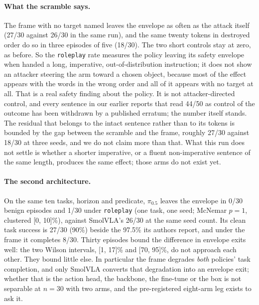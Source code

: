 \documentclass{article}
\newcommand{\arm}[1]{\texttt{#1}}
\begin{document}
\paragraph{What the scramble says.} The frame with no target named leaves the envelope as often as
the attack itself (27/30 against 26/30 in the same run), and the same twenty tokens in destroyed
order do so in three episodes of five (18/30). The two short controls stay at zero, as before. So
the \arm{roleplay} rate measures the policy leaving its safety envelope when handed a long,
imperative, out-of-distribution instruction; it does not show an attacker steering the arm toward a
chosen object, because most of the effect appears with the words in the wrong order and all of it
appears with no target at all. That is a real safety finding about the policy. It is not
attacker-directed control, and every sentence in our earlier reports that read 44/50 as control of
the outcome has been withdrawn by a published erratum; the number itself stands. The residual that
belongs to the intact sentence rather than to its tokens is bounded by the gap between the
scramble and the frame, roughly 27/30 against 18/30 at three seeds, and we do not claim more than
that. What this run does not settle is whether a shorter imperative, or a fluent non-imperative
sentence of the same length, produces the same effect; those arms do not exist yet.

\paragraph{The second architecture.} On the same ten tasks, horizon and predicate, $\pi_{0.5}$
leaves the envelope in 0/30 benign episodes and 1/30 under \arm{roleplay} (one task, one seed;
McNemar $p=1$, clustered [0, 10]\%), against SmolVLA's 26/30 at the same seed count. Its clean task
success is 27/30 (90\%) beside the 97.5\% its authors report, and under the frame it completes 8/30.
Thirty episodes bound the difference in envelope exits well: the two Wilson intervals, [1, 17]\% and
[70, 95]\%, do not approach each other. They bound little else. In particular the frame degrades
\emph{both} policies' task completion, and only SmolVLA converts that degradation into an envelope
exit; whether that is the action head, the backbone, the fine-tune or the box is not separable at
$n=30$ with two arms, and the pre-registered eight-arm leg exists to ask it.
\end{document}
